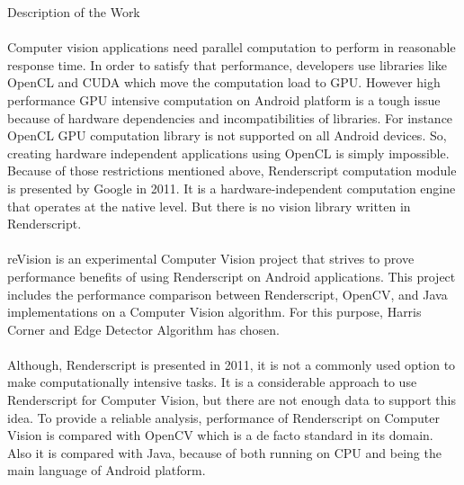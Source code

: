 \documentclass[12pt, a4paper]{article} \pagenumbering{gobble}
\begin{document}
\newpage
\begin{section}{Description of the Work}
\paragraph{}{%
  Computer vision applications need parallel computation to perform in reasonable response time.
  In order to satisfy that performance, developers use libraries like OpenCL and CUDA which move the computation
  load to GPU. However high performance GPU intensive computation on Android platform is a tough issue because
  of hardware dependencies and incompatibilities of libraries. For instance OpenCL GPU computation library is not
  supported on all Android devices. So, creating hardware independent applications using OpenCL is simply impossible.
  Because of those restrictions mentioned above, Renderscript computation module is presented by Google in 2011\cite{renderscript_release}.
  It is ﻿a hardware-independent computation engine that operates at the native level\cite{renderscript_api}. But there is no vision library
  written in Renderscript.
}
\paragraph{}{%
  reVision is an experimental Computer Vision project that strives to prove performance benefits of using Renderscript on Android
  applications. This project includes the performance comparison between Renderscript, OpenCV, and Java implementations on a Computer
  Vision algorithm. For this purpose, Harris Corner and Edge Detector Algorithm\cite{harris_article} has chosen.
}

\paragraph{}{
  Although, Renderscript is presented in 2011, it is not a commonly used option to make computationally intensive tasks.
  It is a considerable approach to use Renderscript for Computer Vision, but there are not enough data to support this idea.
  To provide a reliable analysis, performance of Renderscript on Computer Vision is compared with OpenCV\cite{opencv} which is a de facto standard
  in its domain. Also it is compared with Java, because of both running on CPU and being the main language of Android platform.
}
\end{section}

\newpage
\end{document}
